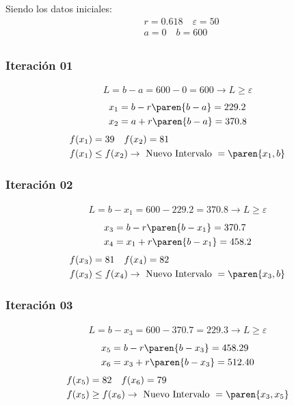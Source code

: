 \begin{homeworkProblem}[-1][Hughesco]
Siendo los datos iniciales:
\begin{align*}
    &r=0.618\quad \varepsilon = 50 \\
    &a=0\quad  b=600\\
\end{align*}


\subsubsection{Iteración 01}
\begin{align*}
    L=b-a=600-0=600 \rightarrow L \geq \varepsilon
\end{align*}
\begin{align*}
    &x_1=b - r\paren{b-a}= 229.2 \\
    &x_2=a + r\paren{b-a}= 370.8 
\end{align*}
\begin{align*}
    &f(x_1)=39 \quad f(x_2)=81 \\
    &f(x_1) \leq f(x_2) \rightarrow \text{ Nuevo Intervalo } = \paren{x_1,b}
\end{align*}


\subsubsection{Iteración 02}
\begin{align*}
    L=b-x_1=600-229.2=370.8 \rightarrow L \geq \varepsilon
\end{align*}
\begin{align*}
    &x_3=b - r\paren{b-x_1}= 370.7 \\
    &x_4=x_1 + r\paren{b-x_1}= 458.2
\end{align*}
\begin{align*}
    &f(x_3)=81 \quad f(x_4)=82 \\
    &f(x_3) \leq f(x_4) \rightarrow \text{ Nuevo Intervalo } = \paren{x_3,b}
\end{align*}

\subsubsection{Iteración 03}
\begin{align*}
    L=b-x_3=600-370.7=229.3 \rightarrow L \geq \varepsilon
\end{align*}
\begin{align*}
    &x_5=b - r\paren{b-x_3}= 458.29 \\
    &x_6=x_3 + r\paren{b-x_3}= 512.40
\end{align*}
\begin{align*}
    &f(x_5)=82 \quad f(x_6)=79 \\
    &f(x_5) \geq f(x_6) \rightarrow \text{ Nuevo Intervalo } = \paren{x_3,x_5}
\end{align*}


\end{homeworkProblem}
